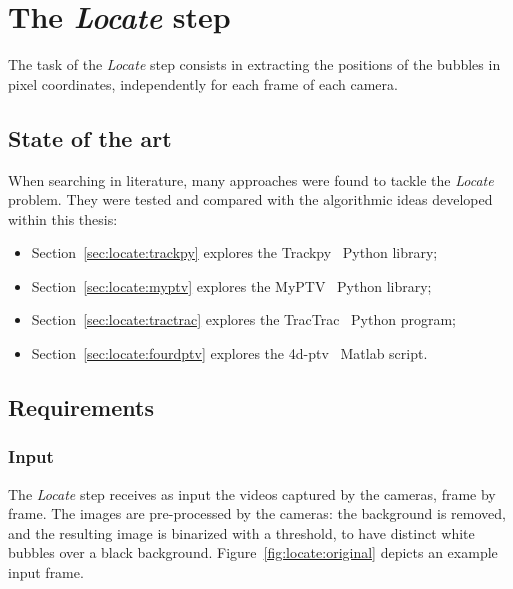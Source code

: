 \chapter{The \textit{Locate} step}
\label{chap:locate}

\newcommand{\locateimgsize}{0.9\textwidth}

The task of the \textit{Locate} step consists in extracting the positions of the bubbles in pixel coordinates, independently for each frame of each camera.

\section{State of the art}

When searching in literature, many approaches were found to tackle the \textit{Locate} problem.
They were tested and compared with the algorithmic ideas developed within this thesis:
\begin{itemize}
	\itemsep 0em
	\item Section~\ref{sec:locate:trackpy} explores the Trackpy~\cite{trackpy} Python library;
	\item Section~\ref{sec:locate:myptv} explores the MyPTV~\cite{myptv} Python library;
	\item Section~\ref{sec:locate:tractrac} explores the TracTrac~\cite{tractrac} Python program;
	\item Section~\ref{sec:locate:fourdptv} explores the 4d-ptv~\cite{fourdptv} Matlab script.
\end{itemize}

\section{Requirements}

\subsection{Input}
The \textit{Locate} step receives as input the videos captured by the cameras, frame by frame.
The images are pre-processed by the cameras: the background is removed, and the resulting image is binarized with a threshold, to have distinct white bubbles over a black background.
Figure~\ref{fig:locate:original} depicts an example input frame.

